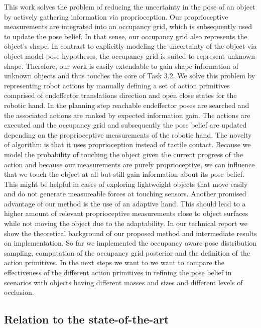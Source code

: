 \documentclass[a4paper,11pt,pdf]{pacmanreport}
\begin{document}
This work solves the problem of reducing the uncertainty in the pose of an object by actively gathering information via proprioception.
Our proprioceptive measurements are integrated into an occupancy grid, which is subsequently used to update the pose belief.
In that sense, our occupancy grid also represents the object's shape. 
In contrast to explicitly modeling the uncertainty of the object via object model pose hypotheses, the occupancy grid is suited to 
represent unknown shape. Therefore, our work is easily extendable to gain shape information of unknown objects and thus touches the core of Task 3.2.
We  solve this problem by representing robot actions by manually defining a set of action primitives comprised of endeffector translations direction and
open close states for the robotic hand. In the planning step reachable endeffector poses are searched and the associated actions are ranked 
by expected information gain.
The actions are executed and the occupancy grid and subsequently the pose belief are updated depending on the proprioceptive measurements of the robotic hand.
The novelty of algorithm is that it uses proprioception instead of tactile contact. Because we model the probability of touching the object 
given the current progress of the action and because our measurements are purely proprioceptive, we can influence that we touch the object at all but still 
gain information about its pose belief. This might be helpful in cases of exploring lightweight objects that move easily and do not 
generate measureable forces at touching sensors.
Another promised advantage of our method is the use of an adaptive hand. This should lead to a higher amount of 
relevant proprioceptive measurements close to object surfaces while not moving the object due to the adaptability.
In our technical report we show the theoretical background of our proposed method and intermediate results on implementation. 
So far we implemented the occupancy aware pose distribution sampling, computation of the occupancy grid posterior and the definition of the action primitives.
In the next steps we want to we want to compare the effectiveness of the different action primitives in refining the pose belief in scenarios with objects 
having different masses and sizes and different levels of occlusion. 

\subsection{Relation to the state-of-the-art}
\end{document}
